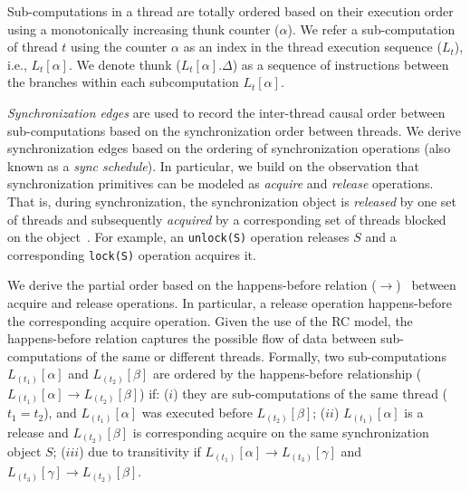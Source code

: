 Sub-computations in a thread are totally ordered based on their execution order using a monotonically increasing thunk counter ($\alpha$). We refer a sub-computation of thread $t$ using the counter $\alpha$ as an index in the thread execution sequence ($L_t$), i.e., $L_t[\alpha]$.  We denote thunk ($L_t[\alpha].\Delta$) as a sequence of instructions between the branches within each subcomputation $L_t[\alpha]$. 


  {\em Synchronization edges}   are
used to record the inter-thread causal order between sub-computations based on the synchronization order between threads. 
We derive synchronization edges based on the ordering of synchronization operations (also known as a {\em sync schedule}). In particular,  we build on the observation that synchronization primitives can be modeled as {\em acquire} and {\em release} operations. That is,   during synchronization, the synchronization object is {\em released} by one set of threads and subsequently  {\em acquired} by a corresponding set of threads blocked on the object~\cite{fast-track-pldi}. For example, an {\tt unlock(S)} operation releases $S$
and a corresponding {\tt lock(S)} operation acquires it.



We derive the partial order based on the happens-before relation
($\rightarrow$)~\cite{djit,fast-track-pldi} between acquire and release operations. In particular, a release
operation happens-before the corresponding acquire operation. Given
the use of the RC model, the happens-before relation
captures the possible flow of data between sub-computations of the same or different threads.
Formally, two sub-computations $L_{(t_1)}[\alpha]$ and
$L_{(t_2)}[\beta]$ are ordered by the happens-before relationship ($L_{(t_1)}[\alpha] \rightarrow
L_{(t_2)}[\beta]$) if:  ($i$)  they are sub-computations of the
same thread ($t_1 = t_2$), and $L_{(t_1)}[\alpha]$ was executed before $L_{(t_2)}[\beta]$; ($ii$)  $L_{(t_1)}[\alpha]$  is a release and $L_{(t_2)}[\beta]$ is corresponding acquire on the same synchronization object $S$; ($iii$) due to transitivity if  
 $L_{(t_1)}[\alpha] \rightarrow L_{(t_3)}[\gamma] $ and $L_{(t_3)}[\gamma]  \rightarrow L_{(t_2)}[\beta]$.


